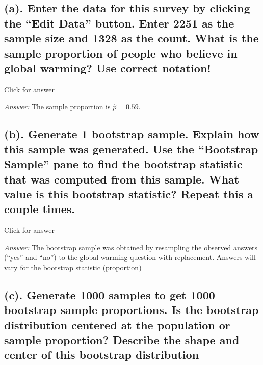 \documentclass[
]{book}
\begin{document}
\hypertarget{a.-enter-the-data-for-this-survey-by-clicking-the-edit-data-button.-enter-2251-as-the-sample-size-and-1328-as-the-count.-what-is-the-sample-proportion-of-people-who-believe-in-global-warming-use-correct-notation}{%
\subsection{(a). Enter the data for this survey by clicking the ``Edit Data'' button. Enter 2251 as the sample size and 1328 as the count. What is the sample proportion of people who believe in global warming? Use correct notation!}\label{a.-enter-the-data-for-this-survey-by-clicking-the-edit-data-button.-enter-2251-as-the-sample-size-and-1328-as-the-count.-what-is-the-sample-proportion-of-people-who-believe-in-global-warming-use-correct-notation}}

Click for answer

\emph{Answer:} The sample proportion is \(\hat{p} = 0.59\).

\hypertarget{b.-generate-1-bootstrap-sample.-explain-how-this-sample-was-generated.-use-the-bootstrap-sample-pane-to-find-the-bootstrap-statistic-that-was-computed-from-this-sample.-what-value-is-this-bootstrap-statistic-repeat-this-a-couple-times.}{%
\subsection{(b). Generate 1 bootstrap sample. Explain how this sample was generated. Use the ``Bootstrap Sample'' pane to find the bootstrap statistic that was computed from this sample. What value is this bootstrap statistic? Repeat this a couple times.}\label{b.-generate-1-bootstrap-sample.-explain-how-this-sample-was-generated.-use-the-bootstrap-sample-pane-to-find-the-bootstrap-statistic-that-was-computed-from-this-sample.-what-value-is-this-bootstrap-statistic-repeat-this-a-couple-times.}}

Click for answer

\emph{Answer:} The bootstrap sample was obtained by resampling the observed answers (``yes'' and ``no'') to the global warming question with replacement. Answers will vary for the bootstrap statistic (proportion)

\hypertarget{c.-generate-1000-samples-to-get-1000-bootstrap-sample-proportions.-is-the-bootstrap-distribution-centered-at-the-population-or-sample-proportion-describe-the-shape-and-center-of-this-bootstrap-distribution}{%
\subsection{(c). Generate 1000 samples to get 1000 bootstrap sample proportions. Is the bootstrap distribution centered at the population or sample proportion? Describe the shape and center of this bootstrap distribution}\label{c.-generate-1000-samples-to-get-1000-bootstrap-sample-proportions.-is-the-bootstrap-distribution-centered-at-the-population-or-sample-proportion-describe-the-shape-and-center-of-this-bootstrap-distribution}}
\end{document}
